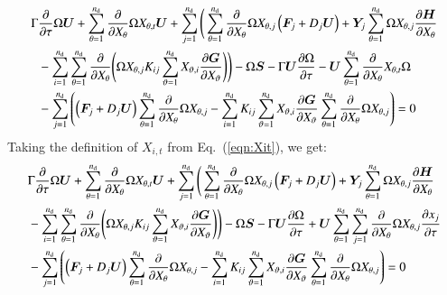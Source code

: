 \documentclass{warpdoc}
\newcommand{\alb}{\vspace{0.2cm}\\} %
\newcommand{\nd}{{{n}_{\rm d}}}
\newcommand{\mfd}{\displaystyle}
\renewcommand{\vec}[1]{\bm{#1}}
\begin{document}
\begin{align}
    \mfd\Gamma &\frac{\partial }{\partial \tau} \Omega\vec{U}
    + \sum_{\theta=1}^\nd  \frac{\partial }{\partial X_\theta} \Omega X_{\theta,t} \vec{U}
    + \sum_{j=1}^\nd \Bigg( \sum_{\theta=1}^\nd \frac{\partial}{\partial X_\theta} \Omega X_{\theta,j} \left(\vec{F}_j+D_j \vec{U}\right)+\vec{Y}_j  \sum_{\theta=1}^\nd \Omega X_{\theta,j}\frac{\partial \vec{H}}{\partial X_\theta}
     \nonumber\alb
    &- \sum_{i=1}^\nd \sum_{\theta=1}^\nd   \frac{\partial}{\partial X_\theta}
       \Bigg( \Omega X_{\theta,j} K_{ij} \sum_{\vartheta=1}^\nd X_{\vartheta,i}\frac{\partial \vec{G}}{\partial X_\vartheta} \Bigg)\Bigg)
    - \Omega\vec{S} 
    -\Gamma \vec{U} \frac{\partial \Omega}{\partial \tau}  
    - \vec{U} \sum_{\theta=1}^\nd  \frac{\partial }{\partial X_\theta} X_{\theta,t}\Omega \nonumber\alb
    &- \sum_{j=1}^\nd \left( \left(\vec{F}_j+D_j\vec{U}\right) \sum_{\theta=1}^\nd \frac{\partial}{\partial X_\theta} \Omega X_{\theta,j}
    - \sum_{i=1}^\nd K_{ij} \sum_{\vartheta=1}^\nd X_{\vartheta,i}\frac{\partial \vec{G}}{\partial X_\vartheta} \sum_{\theta=1}^\nd   \frac{\partial}{\partial X_\theta}
        \Omega X_{\theta,j}   \right)
    =0
 \label{eqn:goveq4}
\end{align}
%
Taking the definition of $X_{i,t}$ from Eq.\  (\ref{eqn:Xit}),
we get:
%
\begin{align}
    \mfd&\Gamma \frac{\partial }{\partial \tau} \Omega\vec{U}
     + \sum_{\theta=1}^\nd  \frac{\partial }{\partial X_\theta} \Omega X_{\theta,t} \vec{U}
    + \sum_{j=1}^\nd \Bigg( \sum_{\theta=1}^\nd \frac{\partial}{\partial X_\theta} \Omega X_{\theta,j} \left(\vec{F}_j+D_j \vec{U}\right)+\vec{Y}_j  \sum_{\theta=1}^\nd \Omega X_{\theta,j}\frac{\partial \vec{H}}{\partial X_\theta}
     \nonumber\alb
    &- \sum_{i=1}^\nd \sum_{\theta=1}^\nd   \frac{\partial}{\partial X_\theta}
       \Bigg( \Omega X_{\theta,j} K_{ij} \sum_{\vartheta=1}^\nd X_{\vartheta,i}\frac{\partial \vec{G}}{\partial X_\vartheta} \Bigg)\Bigg)
    - \Omega\vec{S} 
    -\Gamma \vec{U} \frac{\partial \Omega}{\partial \tau}  
    + \vec{U} \sum_{\theta=1}^\nd \sum_{j=1}^\nd \frac{\partial }{\partial X_\theta} \Omega X_{\theta,j}\frac{\partial x_j}{\partial \tau} \nonumber\alb
    &- \sum_{j=1}^\nd \left( \left(\vec{F}_j+D_j\vec{U}\right) \sum_{\theta=1}^\nd \frac{\partial}{\partial X_\theta} \Omega X_{\theta,j}
    - \sum_{i=1}^\nd K_{ij} \sum_{\vartheta=1}^\nd X_{\vartheta,i}\frac{\partial \vec{G}}{\partial X_\vartheta} \sum_{\theta=1}^\nd   \frac{\partial}{\partial X_\theta}
        \Omega X_{\theta,j}   \right)
    =0
 \label{eqn:goveq5}
\end{align}
\end{document}
